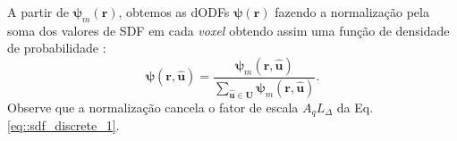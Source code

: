 \documentclass[
    12pt,                %
    oneside,            %
    a4paper,            %
    english,            %
    french,                %
    spanish,            %
    brazil                %
    ]{abntex2}
\begin{document}
A partir de $\boldsymbol{\psi}_m(\mathbf{r})$, obtemos as dODFs $\boldsymbol{\psi}(\mathbf{r})$ fazendo a normalização pela soma dos valores de SDF em cada \textit{voxel} obtendo assim uma função de densidade de probabilidade \cite{yeh2010}:
\begin{equation}
\label{eq::SDF2dODF_prob}
    \boldsymbol{\psi}(\mathbf{r}, \mathbf{\hat{u}}) =
    \frac{\boldsymbol{\psi}_m(\mathbf{r}, \mathbf{\hat{u}})}{\sum \limits_{\mathbf{\hat{u}} \in \mathbf{U}}\boldsymbol{\psi}_m(\mathbf{r}, \mathbf{\hat{u}})}.
\end{equation}
Observe que a normalização cancela o fator de escala $A_qL_{\Delta}$ da Eq. \ref{eq::sdf_discrete_1}.






\end{document}
